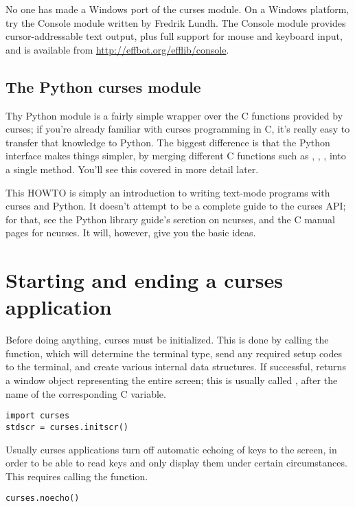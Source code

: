 \documentclass{howto}
\begin{document}
No one has made a Windows port of the curses module.  On a Windows
platform, try the Console module written by Fredrik Lundh.  The
Console module provides cursor-addressable text output, plus full
support for mouse and keyboard input, and is available from
\url{http://effbot.org/efflib/console}.

\subsection{The Python curses module}

Thy Python module is a fairly simple wrapper over the C functions
provided by curses; if you're already familiar with curses programming
in C, it's really easy to transfer that knowledge to Python.  The
biggest difference is that the Python interface makes things simpler,
by merging different C functions such as ,
, , into a single
 method.  You'll see this covered in more detail
later.

This HOWTO is simply an introduction to writing text-mode programs
with curses and Python. It doesn't attempt to be a complete guide to
the curses API; for that, see the Python library guide's serction on
ncurses, and the C manual pages for ncurses.  It will, however, give
you the basic ideas.

\section{Starting and ending a curses application}

Before doing anything, curses must be initialized.  This is done by
calling the  function, which will determine the
terminal type, send any required setup codes to the terminal, and
create various internal data structures.  If successful,
 returns a window object representing the entire
screen; this is usually called , after the name of the
corresponding C
variable.

\begin{verbatim}
import curses
stdscr = curses.initscr()
\end{verbatim}

Usually curses applications turn off automatic echoing of keys to the
screen, in order to be able to read keys and only display them under
certain circumstances.  This requires calling the 
function.

\begin{verbatim}
curses.noecho()
\end{verbatim}
\end{document}
